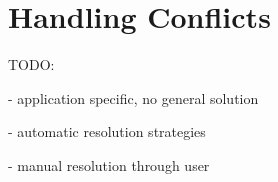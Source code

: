 
\section{Handling Conflicts}

TODO:

- application specific, no general solution

- automatic resolution strategies

- manual resolution through user

